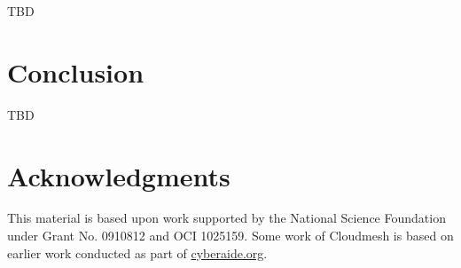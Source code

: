 \documentclass{tex/sig-alternate-2013}
\begin{document}
TBD

\section{Conclusion}

TBD





\section{Acknowledgments}

This material is based upon work supported by the National Science
Foundation under Grant No. 0910812 and OCI 1025159. Some work of
Cloudmesh is based on earlier work conducted as part of \url{cyberaide.org}.



 

%

\balancecolumns 
\end{document}
